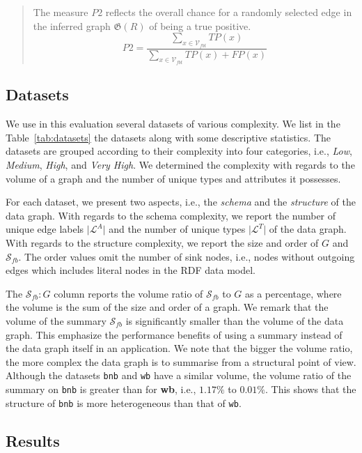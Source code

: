 \begin{quotation}
The measure $P2$ reflects the overall chance for a randomly selected edge in the inferred graph $\mathfrak{G}(R)$ of being a true positive.
$$
P2 = \frac{\sum_{x \in \mathcal{V}_{fbt}}{TP(x)}}{\sum_{x \in \mathcal{V}_{fbt}}{TP(x) + FP(x)}}
$$
\end{quotation}

\subsection{Datasets}
\label{sec:eval:datasets}

We use in this evaluation several datasets of various complexity. We list in the Table~\ref{tab:datasets} the datasets along with some descriptive statistics. The datasets are grouped according to their complexity into four categories, i.e., \emph{Low}, \emph{Medium}, \emph{High}, and \emph{Very High}. We determined the complexity with regards to the volume of a graph and the number of unique types and attributes it possesses.

For each dataset, we present two aspects, i.e., the \emph{schema} and the \emph{structure} of the data graph. With regards to the schema complexity, we report the number of unique edge labels $\vert \mathcal{L}^A \vert$ and the number of unique types $\vert \mathcal{L}^T \vert$ of the data graph. With regards to the structure complexity, we report the size and order of $G$ and  $\mathcal{S}_{fb}$. The order values omit the number of sink nodes, i.e., nodes without outgoing edges which includes literal nodes in the RDF data model.

The $\mathcal{S}_{fb}:G$ column reports the volume ratio of $\mathcal{S}_{fb}$ to $G$ as a percentage, where the volume is the sum of the size and order of a graph. We remark that the volume of the summary $\mathcal{S}_{fb}$ is significantly smaller than the volume of the data graph. This emphasize the performance benefits of using a summary instead of the data graph itself in an application. We note that the bigger the volume ratio, the more complex the data graph is to summarise from a structural point of view. Although the datasets \texttt{bnb} and \texttt{wb} have a similar volume, the volume ratio of the summary on \texttt{bnb} is greater than for \textbf{wb}, i.e., $1.17\%$ to $0.01\%$. This shows that the structure of \texttt{bnb} is more heterogeneous than that of \texttt{wb}.



\subsection{Results}
\label{sec:eval:results}

